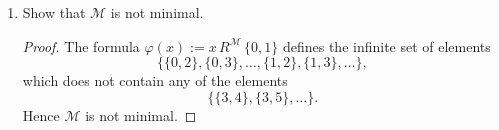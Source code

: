\documentclass{article}
\begin{document}
\begin{enumerate}
\begin{enumerate}
        \begin{enumerate}
          \item Show that $\mathcal{M}$ is not minimal.
            \begin{proof}
              The formula $\varphi(x):=x\,R^{\mathcal{M}}\,\{0,1\}$
              defines the infinite set of elements
              \begin{equation*}
                \{\{0,2\},\{0,3\},\ldots,\{1,2\},\{1,3\},\ldots\},
              \end{equation*}
              which does not contain any of the elements
              \begin{equation*}
                \{\{3,4\},\{3,5\},\ldots\}.
              \end{equation*}
              Hence $\mathcal{M}$ is not minimal.
            \end{proof}


\end{enumerate}
\end{enumerate}
\end{enumerate}
\end{document}
